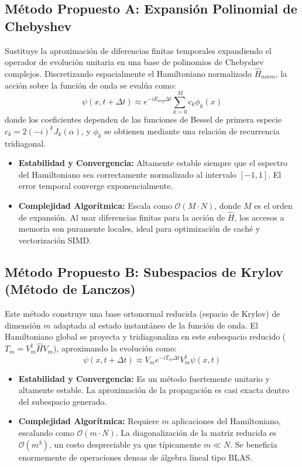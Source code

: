 \documentclass[12pt, a4paper]{article}
\begin{document}
\subsection{Método Propuesto A: Expansión Polinomial de Chebyshev}
Sustituye la aproximación de diferencias finitas temporales expandiendo el operador de evolución unitaria en una base de polinomios de Chebyshev complejos. Discretizando espacialmente el Hamiltoniano normalizado $\hat{H}_{norm}$, la acción sobre la función de onda se evalúa como:
$$ \psi(x, t+\Delta t) \approx e^{-i E_{avg} \Delta t} \sum_{k=0}^{M} c_k \phi_k(x) $$
donde los coeficientes dependen de las funciones de Bessel de primera especie $c_k = 2(-i)^k J_k(\alpha)$, y $\phi_k$ se obtienen mediante una relación de recurrencia tridiagonal.
\begin{itemize}
    \item \textbf{Estabilidad y Convergencia:} Altamente estable siempre que el espectro del Hamiltoniano sea correctamente normalizado al intervalo $[-1, 1]$. El error temporal converge exponencialmente.
    \item \textbf{Complejidad Algorítmica:} Escala como $\mathcal{O}(M \cdot N)$, donde $M$ es el orden de expansión. Al usar diferencias finitas para la acción de $\hat{H}$, los accesos a memoria son puramente locales, ideal para optimización de caché y vectorización SIMD.
\end{itemize}

\subsection{Método Propuesto B: Subespacios de Krylov (Método de Lanczos)}
Este método construye una base ortonormal reducida (espacio de Krylov) de dimensión $m$ adaptada al estado instantáneo de la función de onda. El Hamiltoniano global se proyecta y tridiagonaliza en este subespacio reducido ($T_m = V_m^\dagger \hat{H} V_m$), aproximando la evolución como:
$$ \psi(x, t+\Delta t) \approx V_m e^{-i T_m \Delta t} V_m^\dagger \psi(x,t) $$
\begin{itemize}
    \item \textbf{Estabilidad y Convergencia:} Es un método fuertemente unitario y altamente estable. La aproximación de la propagación es casi exacta dentro del subespacio generado.
    \item \textbf{Complejidad Algorítmica:} Requiere $m$ aplicaciones del Hamiltoniano, escalando como $\mathcal{O}(m \cdot N)$. La diagonalización de la matriz reducida es $\mathcal{O}(m^3)$, un costo despreciable ya que típicamente $m \ll N$. Se beneficia enormemente de operaciones densas de álgebra lineal tipo BLAS.
\end{itemize}
\end{document}

